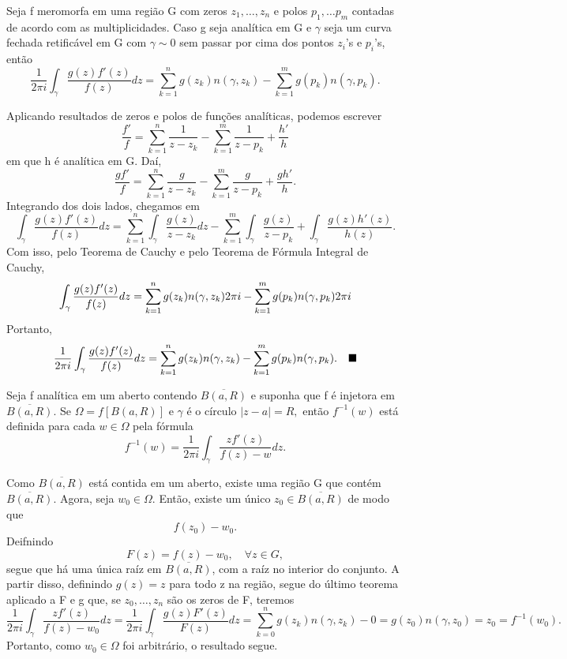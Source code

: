 \documentclass[ComplexAnalysis/complex.tex]{subfiles}
\begin{document}
\begin{theorem*}
	Seja f meromorfa em uma região G com zeros \(z_{1},\dotsc , z_{n}\) e polos \(p_{1},\dotsc p_{m}\)
	contadas de acordo com as multiplicidades. Caso g seja analítica em G e \(\gamma \) seja um curva fechada retificável em G
	com \(\gamma \sim 0\) sem passar por cima dos pontos \(z_{i}\)'s e \(p_{i}\)'s, então
	\[
		\frac{1}{2\pi i}\int_{\gamma }^{}\frac{g(z)f'(z)}{f(z)}dz = \sum\limits_{k=1}^{n}g(z_{k})n(\gamma , z_{k}) - \sum\limits_{k=1}^{m}g(p_{k})n(\gamma , p_{k}).
	\]
\end{theorem*}
\begin{proof*}
	Aplicando resultados de zeros e polos de funções analíticas, podemos escrever
	\[
		\frac{f'}{f} = \sum\limits_{k=1}^{n}\frac{1}{z-z_{k}} - \sum\limits_{k=1}^{m}\frac{1}{z-p_{k}} + \frac{h'}{h}
	\]
	em que h é analítica em G. Daí,
	\[
		\frac{gf'}{f} = \sum\limits_{k=1}^{n}\frac{g}{z-z_{k}} - \sum\limits_{k=1}^{m}\frac{g}{z-p_{k}} + \frac{gh'}{h}.
	\]
	Integrando dos dois lados, chegamos em
	\[
		\int_{\gamma }^{}\frac{g(z)f'(z)}{f(z)}dz = \sum\limits_{k=1}^{n}\int_{\gamma }^{}\frac{g(z)}{z-z_{k}}dz - \sum\limits_{k=1}^{m}\int_{\gamma }^{}\frac{g(z)}{z-p_{k}} + \int_{\gamma }^{}\frac{g(z)h'(z)}{h(z)}.
	\]
	Com isso, pelo Teorema de Cauchy e pelo Teorema de Fórmula Integral de Cauchy,
	\[
		\int_{\gamma }^{}\frac{g(z)f'(z)}{f(z)}dz = \sum\limits_{k=1}^{n}g(z_{k})n(\gamma , z_{k})2\pi i - \sum\limits_{k=1}^{m}g(p_{k})n(\gamma , p_{k})2\pi i\\
	\]
	Portanto,
	\[
		\frac{1}{2\pi i}\int_{\gamma }^{}\frac{g(z)f'(z)}{f(z)}dz = \sum\limits_{k=1}^{n}g(z_{k})n(\gamma , z_{k}) - \sum\limits_{k=1}^{m}g(p_{k})n(\gamma , p_{k}).\quad \text{$\blacksquare$}
	\]
\end{proof*}
\begin{prop*}
	Seja f analítica em um aberto contendo \(\overline{B(a, R)}\) e suponha que f é injetora em \(\overline{B(a, R)}.\) Se \(\Omega = f[B(a, R)]\) e \(\gamma \) é o círculo
	\(|z-a| = R,\) então \(f^{-1}(w)\) está definida para cada \(w\in \Omega \) pela fórmula
	\[
		f^{-1}(w) = \frac{1}{2\pi i}\int_{\gamma }^{}\frac{zf'(z)}{f(z)-w}dz.
	\]
\end{prop*}
\begin{proof*}
	Como \(\overline{B(a, R)}\) está contida em um aberto, existe uma região G que contém \(\overline{B(a, R)}.\) Agora, seja \(w_{0}\in\Omega .\) Então,
	existe um único \(z_{0}\in \overline{B(a, R)}\) de modo que
	\[
		f(z_{0}) - w_{0}.
	\]
	Deifnindo
	\[
		F(z) = f(z)-w_{0},\quad \forall z\in G,
	\]
	segue que há uma única raíz em \(\overline{B(a, R)}\), com a raíz no interior do conjunto. A partir disso, definindo \(g(z) = z\) para todo z na região, segue do último teorema
	aplicado a F e g que, se \(z_{0},\dotsc , z_{n}\) são os zeros de F, teremos
	\[
		\frac{1}{2\pi i}\int_{\gamma }^{}\frac{zf'(z)}{f(z) - w_{0}}dz = \frac{1}{2\pi i}\int_{\gamma }^{}\frac{g(z)F'(z)}{F(z)}dz = \sum\limits_{k=0}^{n}g(z_{k})n(\gamma , z_{k}) - 0 = g(z_{0})n(\gamma , z_{0}) = z_{0} = f^{-1}(w_{0}).
	\]
	Portanto, como \(w_{0}\in \Omega \) foi arbitrário, o resultado segue. \qedsymbol
\end{proof*}
\end{document}
